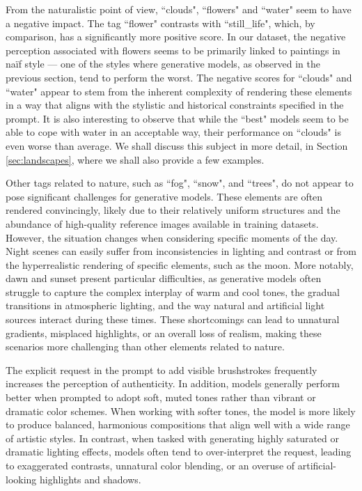 \documentclass[sn-mathphys]{sn-jnl}
\begin{document}
From the naturalistic point of view, ``clouds", ``flowers" and ``water" seem to have a negative impact. The tag ``flower" contrasts with ``still\_life", which, by comparison, has a significantly more positive score. In our dataset, the negative perception associated with flowers seems to be primarily linked to paintings in naïf style — one of the styles where generative models, as observed in the previous section, tend to perform the worst. 
The negative scores for ``clouds" and ``water" appear to stem from the inherent complexity of rendering these elements in a way that aligns with the stylistic and historical constraints specified in the prompt.  It is 
also interesting to observe that while the ``best" models seem to be able to cope with water in an acceptable way, their performance on ``clouds" is even worse than average.
We shall discuss this subject in more detail, in Section \ref{sec:landscapes},
where we shall also provide a few examples.

Other tags related to nature, such as ``fog", ``snow", and ``trees", do not appear to pose significant challenges for generative models. These elements are often rendered convincingly, likely due to their relatively uniform structures and the abundance of high-quality reference images available in training datasets. However, the situation changes when considering specific moments of the day. Night scenes can easily suffer from inconsistencies in lighting and contrast or from the hyperrealistic rendering of specific elements, such as the moon. More notably, dawn and sunset present particular difficulties, as generative models often struggle to capture the complex interplay of warm and cool tones, the gradual transitions in atmospheric lighting, and the way natural and artificial light sources interact during these times. These shortcomings can lead to unnatural gradients, misplaced highlights, or an overall loss of realism, making these scenarios more challenging than other elements related to nature.

The explicit request in the prompt to add visible brushstrokes frequently increases the perception of authenticity. In addition, 
models generally perform better when prompted to adopt soft, muted tones rather than vibrant or dramatic color schemes. When working with softer tones, the model is more likely to produce balanced, harmonious compositions that align well with a wide range of artistic styles. In contrast, when tasked with generating highly saturated or dramatic lighting effects, models often tend to over-interpret the request, leading to exaggerated contrasts, unnatural color blending, or an overuse of artificial-looking highlights and shadows.
\end{document}
